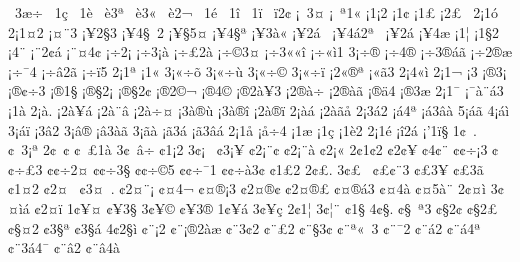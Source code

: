 {^^a03^^e6^^f7
^^a01^^e7
^^a01^^e8
^^a0^^e83^^aa
^^a0^^e83^^ab
^^a0^^e82^^ac
^^a01^^e9
^^a01^^ee
^^a01^^ef
^^a0^^ef2^^a2
^^a1^^a03^^a4
^^a1^^a0^^aa1^^ab
^^a11^^a12
^^a11^^a2
^^a11^^a3
^^a12^^a3^^a0
2^^a11^^f3
2^^a11^^a42
^^a1^^a4^^a83
^^a1^^a52^^a73
^^a1^^a54^^a7^^a02
^^a1^^a5^^a75^^a4
^^a1^^a54^^a7^^aa
^^a1^^a53^^e0^^ab
^^a1^^a52^^e1^^a0
^^a1^^a54^^e12^^aa^^a0
^^a1^^a52^^e1^^ad
^^a1^^a54^^e6
^^a11^^a6
^^a11^^a72
^^a14^^a8
^^a1^^a82^^a2^^e1
^^a1^^a8^^a44^^a2
^^a1^^f72^^a1
^^a1^^f73^^a1^^e0
^^a1^^f7^^a32^^e0
^^a1^^f7^^a93^^a4
^^a1^^f73^^ab^^ab^^ee
^^a1^^f7^^ab^^ec1
3^^a1^^f7^^ae
^^a1^^f74^^ae^^ad
^^a1^^f73^^ae^^e1^^e3
^^a1^^f72^^ae^^e6
^^a1^^f7^^af4
^^a1^^f7^^e22^^ad^^e3
^^a1^^f7^^ef5
2^^a11^^aa
^^a11^^ab
3^^a1^^ab^^f7^^f5
3^^a1^^ab^^f7^^f9
3^^a1^^ab^^f7^^a9
3^^a1^^ab^^f7^^ef
^^a12^^ab^^ae^^aa
^^a1^^ab^^e33
2^^a14^^ab^^ec
2^^a11^^ac
^^a13^^ad
^^a1^^ae3^^a1
^^a1^^ae^^a2^^f73
^^a1^^ae1^^a7
^^a1^^ae^^a72^^a1
^^a1^^ae^^a72^^a2
^^a1^^ae2^^a9^^ac
^^a1^^ae4^^a9^^ad
^^a1^^ae2^^e0^^a53^^ad
^^a12^^ae^^e0^^f7
^^a12^^ae^^e0^^e3
^^a1^^ae^^e44
^^a1^^ae3^^e6
2^^a11^^af
^^a1^^af^^e0^^a8^^e13
^^a11^^e0
2^^a1^^e0.
^^a12^^e0^^a5^^e1
^^a12^^e0^^a8^^e2
^^a12^^e0^^f7^^a4
^^a13^^e0^^ae^^f9
^^a13^^e0^^ae^^ee
^^a12^^e0^^ae^^ef
2^^a1^^e0^^e1
^^a12^^e0^^e3^^e5
2^^a13^^e12
^^a1^^e14^^aa
^^a1^^e13^^e2^^e0
5^^a1^^e1^^e3
4^^a1^^e1^^ec
3^^a1^^e1^^ef
^^a13^^e22
3^^a1^^e2^^ae
^^a1^^e23^^e0^^e3
3^^a1^^e3^^e0
^^a1^^e33^^e1
^^a1^^e33^^e2^^e1
2^^a11^^e5
^^a1^^e5^^f74
^^a11^^e6
^^a11^^e7
^^a11^^e82
2^^a11^^e9
^^a1^^ee2^^e1
^^a1'1^^ef^^a7
1^^a2^^a0.
^^a2^^a03^^a1^^aa
2^^a2^^a0^^a2
^^a2^^a0^^a31^^e0
3^^a2^^a0^^e2^^f7
^^a21^^a12
3^^a2^^a1^^a0
^^a23^^a1^^a5
^^a22^^a1^^a8^^a2
^^a22^^a1^^a8^^e0
^^a22^^a1^^ab
2^^a21^^a22
^^a22^^a2^^a5
^^a24^^a2^^a8
^^a2^^a2^^f7^^a13
^^a2^^a2^^f7^^a33
^^a2^^a2^^f72^^a4
^^a2^^a2^^f73^^a7
^^a2^^a2^^f7^^a95
^^a2^^a2^^f7^^af1
^^a2^^a2^^f7^^e03^^a2
^^a21^^a32
2^^a2^^a3.
3^^a2^^a3^^a0
^^a2^^a3^^a2^^a83
^^a2^^a33^^ad^^a5
^^a2^^a33^^ad^^e3
^^a21^^a42
^^a22^^a4^^a0
^^a23^^a4^^a0.
^^a22^^a4^^a8^^a1
^^a2^^a44^^ac
^^a2^^a4^^ae^^a13
^^a22^^a4^^ae^^a2
^^a22^^a4^^ae^^a3
^^a2^^a4^^ae^^e13
^^a2^^a44^^e0
^^a2^^a45^^e0^^a8
2^^a2^^a4^^ec
3^^a2^^a4^^ec^^e1
^^a22^^a4^^ef
1^^a2^^a5^^a4
^^a2^^a53^^a7
3^^a2^^a5^^a9
^^a2^^a53^^ae
1^^a2^^a5^^e1
3^^a2^^a5^^e7
2^^a21^^a6
3^^a2^^a6^^a8
^^a21^^a7
4^^a2^^a7.
^^a2^^a7^^a0^^aa3
^^a2^^a72^^a2
^^a2^^a72^^a3
^^a2^^a7^^a42
^^a23^^a7^^aa
^^a23^^a7^^e1
4^^a22^^a7^^ec
^^a2^^a8^^a12
^^a2^^a8^^a1^^ae2^^e0^^e6
^^a2^^a83^^a22
^^a2^^a8^^a32
^^a2^^a8^^a73^^a2
^^a2^^a8^^aa^^ab^^a03
^^a2^^a8^^af2
^^a2^^a8^^e12
^^a2^^a8^^e14^^aa
^^a2^^a83^^e14^^af
^^a2^^a8^^e22
^^a2^^a8^^e24^^e0
}
